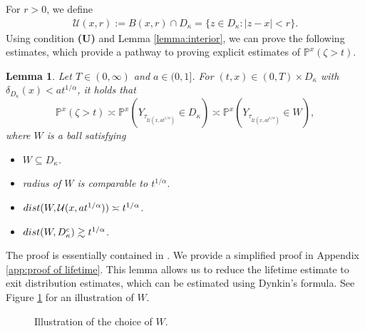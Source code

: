 \documentclass[12pt,a4paper]{amsart}
\numberwithin{equation}{section}
\theoremstyle{plain}
\newcommand{\mc}{\mathcal}
\newcommand{\mb}{\mathbb}
\newcommand{\1}{\mathbbm{1}}
\newcommand{\dist}{{\rm dist}}
\newtheorem{lemma}[theorem]{Lemma}
\begin{document}
For $r>0$, we define
\begin{align}
\mc U(x,r):= B(x,r)\cap D_\kappa = \{z \in D_\kappa: |z-x|<r\}. \label{def:ball}
\end{align} 
Using condition {\bf (U)} and Lemma \ref{lemma:interior}, we can prove the following estimates,
which provide a pathway to proving explicit estimates of $\mb{P}^x(\zeta > t)$.
\begin{lemma}\label{lifetime comparison} 
Let $T \in (0,\infty)$ and $a\in (0,1]$. 
For $(t, x)\in (0, T)\times D_\kappa$
with $\delta_{D_\kappa}(x) < at^{1/\alpha}$, it holds that
$$
\mb{P}^x(\zeta > t) 
\asymp \mb{P}^x(Y_{\tau_{\mc U(x,at^{1/\alpha})}} \in D_\kappa)
\asymp \mb P^x(Y_{\tau_{\mc U(x,at^{1/\alpha})}} \in W),$$ 
where $W$ is a ball satisfying
\begin{itemize}
\item $W \subseteq D_\kappa$. 
\item radius of $W$ is comparable to $t^{1/\alpha}$.
\item $\dist(W, \mc U(x,at^{1/\alpha}) )\asymp t^{1/\alpha}$.
\item $\dist(W, D^c_\kappa) \gtrsim t^{1/\alpha}$.
\end{itemize} 
\end{lemma}
The proof is essentially contained in \cite[Lemmas 2.20 and 2.21]{CKSV20}. We provide a simplified proof in Appendix \ref{app:proof of lifetime}. This lemma allows us to reduce the lifetime estimate to exit distribution estimates, which can be estimated using Dynkin's formula. See Figure \ref{figure0} for an illustration of $W$.


\begin{figure}
\caption{Illustration of the choice of $W$.}
\label{figure0}
\end{figure}
\end{document}

